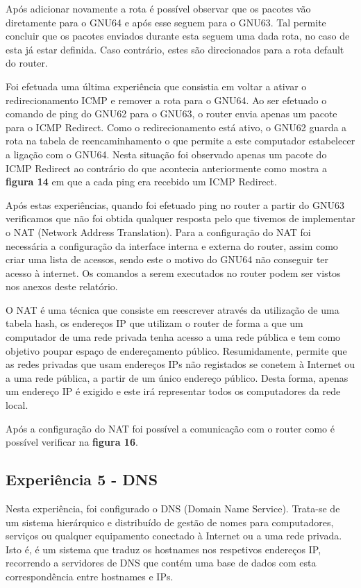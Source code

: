 \documentclass[article, a4paper, 11pt, oneside]{memoir}
\begin{document}
Após adicionar novamente a rota é possível observar que os pacotes vão diretamente para o GNU64 e após esse seguem para o GNU63. 
Tal permite concluir que os pacotes enviados durante esta seguem uma dada rota, no caso de esta já estar definida. 
Caso contrário, estes são direcionados para a rota default do router. 

Foi efetuada uma última experiência que consistia em voltar a ativar o redirecionamento ICMP e remover a rota para o GNU64. 
Ao ser efetuado o comando de ping do GNU62 para o GNU63, o router envia apenas um pacote para o ICMP Redirect. Como o redirecionamento está ativo, o
GNU62 guarda a rota na tabela de reencaminhamento o que permite a este computador estabelecer a ligação com o GNU64. Nesta situação foi observado apenas um 
pacote do ICMP Redirect ao contrário do que acontecia anteriormente como mostra a \textbf{figura 14} em que a cada ping era recebido um ICMP Redirect.

Após estas experiências, quando foi efetuado ping no router a partir do GNU63 verificamos que não foi obtida qualquer resposta pelo que tivemos de 
implementar o NAT (Network Address Translation). 
Para a configuração do NAT foi necessária a configuração da interface interna e externa do router, assim como criar uma lista de acessos, sendo este o motivo
do GNU64 não conseguir ter acesso à internet. Os comandos a serem executados no router podem ser vistos nos anexos deste relatório.

O NAT é uma técnica que consiste em reescrever através da utilização de uma tabela hash, 
os endereços IP que utilizam o router de forma a que
um computador de uma rede privada tenha acesso a uma rede pública e tem como objetivo poupar espaço de endereçamento público.
Resumidamente, permite que as redes privadas que usam endereços IPs não registados se conetem à Internet ou a uma rede pública,
a partir de um único endereço público. 
Desta forma, apenas um endereço IP é exigido e este irá representar todos os computadores da rede local.
 
Após a configuração do NAT foi possível a comunicação com o router como é possível verificar na \textbf{figura 16}.

\subsection{Experiência 5 - DNS}			

Nesta experiência, foi configurado o DNS (Domain Name Service). Trata-se de um sistema hierárquico e distribuído de gestão 
de nomes para computadores, serviços ou qualquer equipamento conectado à
 Internet ou a uma rede privada.
Isto é, é um sistema que traduz os hostnames nos respetivos endereços IP, 
recorrendo a servidores de DNS que contém uma base de dados com esta correspondência entre hostnames e IPs.
\end{document}
